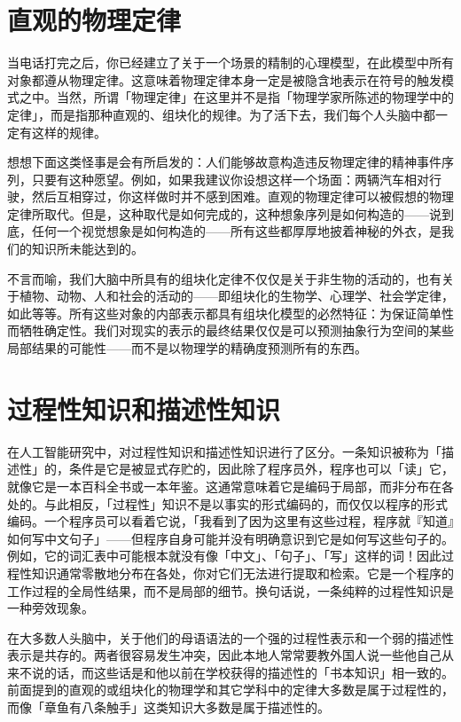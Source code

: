 \documentclass[
  12pt,
  twoside,
  openright,
  oldfontcommands,
]{memoir}
\begin{document}
\section{直观的物理定律}

当电话打完之后，你已经建立了关于一个场景的精制的心理模型，在此模型中所有对象都遵从物理定律。这意味着物理定律本身一定是被隐含地表示在符号的触发模式之中。当然，所谓「物理定律」在这里并不是指「物理学家所陈述的物理学中的定律」，而是指那种直观的、组块化的规律。为了活下去，我们每个人头脑中都一定有这样的规律。

想想下面这类怪事是会有所启发的：人们能够故意构造违反物理定律的精神事件序列，只要有这种愿望。例如，如果我建议你设想这样一个场面：两辆汽车相对行驶，然后互相穿过，你这样做时并不感到困难。直观的物理定律可以被假想的物理定律所取代。但是，这种取代是如何完成的，这种想象序列是如何构造的------说到底，任何一个视觉想象是如何构造的------所有这些都厚厚地披着神秘的外衣，是我们的知识所未能达到的。

不言而喻，我们大脑中所具有的组块化定律不仅仅是关于非生物的活动的，也有关于植物、动物、人和社会的活动的------即组块化的生物学、心理学、社会学定律，如此等等。所有这些对象的内部表示都具有组块化模型的必然特征：为保证简单性而牺牲确定性。我们对现实的表示的最终结果仅仅是可以预测抽象行为空间的某些局部结果的可能性------而不是以物理学的精确度预测所有的东西。

\section{过程性知识和描述性知识}

在人工智能研究中，对过程性知识和描述性知识进行了区分。一条知识被称为「描述性」的，条件是它是被显式存贮的，因此除了程序员外，程序也可以「读」它，就像它是一本百科全书或一本年鉴。这通常意味着它是编码于局部，而非分布在各处的。与此相反，「过程性」知识不是以事实的形式编码的，而仅仅以程序的形式编码。一个程序员可以看着它说，「我看到了因为这里有这些过程，程序就『知道』如何写中文句子」------但程序自身可能并没有明确意识到它是如何写这些句子的。例如，它的词汇表中可能根本就没有像「中文」、「句子」、「写」这样的词！因此过程性知识通常零散地分布在各处，你对它们无法进行提取和检索。它是一个程序的工作过程的全局性结果，而不是局部的细节。换句话说，一条纯粹的过程性知识是一种旁效现象。

在大多数人头脑中，关于他们的母语语法的一个强的过程性表示和一个弱的描述性表示是共存的。两者很容易发生冲突，因此本地人常常要教外国人说一些他自己从来不说的话，而这些话是和他以前在学校获得的描述性的「书本知识」相一致的。前面提到的直观的或组块化的物理学和其它学科中的定律大多数是属于过程性的，而像「章鱼有八条触手」这类知识大多数是属于描述性的。
\end{document}
